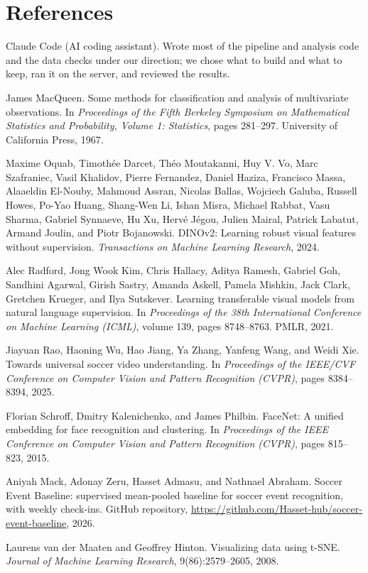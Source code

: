 \documentclass[11pt]{article}
\begin{document}
\section*{References}
\begin{enumerate}[label={[\arabic*]}, noitemsep]
  \item Claude Code (AI coding assistant). Wrote most of the pipeline and analysis code and the data checks
        under our direction; we chose what to build and what to keep, ran it on the server, and reviewed
        the results.
  \item James MacQueen. Some methods for classification and analysis of multivariate observations. In
        \emph{Proceedings of the Fifth Berkeley Symposium on Mathematical Statistics and Probability, Volume 1:
        Statistics}, pages 281--297. University of California Press, 1967.
  \item Maxime Oquab, Timoth\'ee Darcet, Th\'eo Moutakanni, Huy V. Vo, Marc Szafraniec, Vasil Khalidov, Pierre
        Fernandez, Daniel Haziza, Francisco Massa, Alaaeldin El-Nouby, Mahmoud Assran, Nicolas Ballas, Wojciech
        Galuba, Russell Howes, Po-Yao Huang, Shang-Wen Li, Ishan Misra, Michael Rabbat, Vasu Sharma, Gabriel
        Synnaeve, Hu Xu, Herv\'e J\'egou, Julien Mairal, Patrick Labatut, Armand Joulin, and Piotr Bojanowski.
        DINOv2: Learning robust visual features without supervision. \emph{Transactions on Machine Learning
        Research}, 2024.
  \item Alec Radford, Jong Wook Kim, Chris Hallacy, Aditya Ramesh, Gabriel Goh, Sandhini Agarwal, Girish Sastry,
        Amanda Askell, Pamela Mishkin, Jack Clark, Gretchen Krueger, and Ilya Sutskever. Learning transferable
        visual models from natural language supervision. In \emph{Proceedings of the 38th International
        Conference on Machine Learning (ICML)}, volume 139, pages 8748--8763. PMLR, 2021.
  \item Jiayuan Rao, Haoning Wu, Hao Jiang, Ya Zhang, Yanfeng Wang, and Weidi Xie. Towards universal soccer
        video understanding. In \emph{Proceedings of the IEEE/CVF Conference on Computer Vision and Pattern
        Recognition (CVPR)}, pages 8384--8394, 2025.
  \item Florian Schroff, Dmitry Kalenichenko, and James Philbin. FaceNet: A unified embedding for face
        recognition and clustering. In \emph{Proceedings of the IEEE Conference on Computer Vision and Pattern
        Recognition (CVPR)}, pages 815--823, 2015.
  \item Aniyah Mack, Adonay Zeru, Hasset Admasu, and Nathnael Abraham. Soccer Event Baseline: supervised
        mean-pooled baseline for soccer event recognition, with weekly check-ins. GitHub repository,
        \url{https://github.com/Hasset-hub/soccer-event-baseline}, 2026.
  \item Laurens van der Maaten and Geoffrey Hinton. Visualizing data using t-SNE. \emph{Journal of Machine
        Learning Research}, 9(86):2579--2605, 2008.
\end{enumerate}
\end{document}
